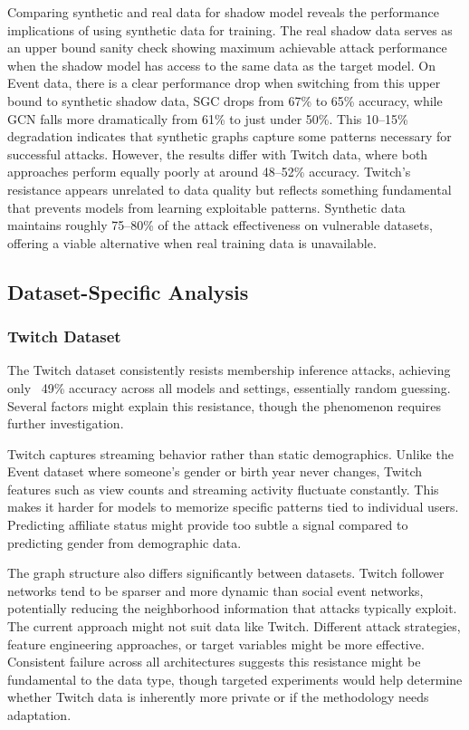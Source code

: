 \documentclass{article}
\begin{document}
Comparing synthetic and real data for shadow model reveals the performance implications of using synthetic data for training. The real shadow data serves as an upper bound sanity check showing maximum achievable attack performance when the shadow model has access to the same data as the target model. On Event data, there is a clear performance drop when switching from this upper bound to synthetic shadow data, SGC drops from 67\% to 65\% accuracy, while GCN falls more dramatically from 61\% to just under 50\%. This 10--15\% degradation indicates that synthetic graphs capture some patterns necessary for successful attacks. However, the results differ with Twitch data, where both approaches perform equally poorly at around 48--52\% accuracy. Twitch's resistance appears unrelated to data quality but reflects something fundamental that prevents models from learning exploitable patterns. Synthetic data maintains roughly 75--80\% of the attack effectiveness on vulnerable datasets, offering a viable alternative when real training data is unavailable.

\subsection{Dataset-Specific Analysis}

\subsubsection{Twitch Dataset}
The Twitch dataset consistently resists membership inference attacks, achieving only ~49\% accuracy across all models and settings, essentially random guessing. Several factors might explain this resistance, though the phenomenon requires further investigation.

Twitch captures streaming behavior rather than static demographics. Unlike the Event dataset where someone's gender or birth year never changes, Twitch features such as view counts and streaming activity fluctuate constantly. This makes it harder for models to memorize specific patterns tied to individual users. Predicting affiliate status might provide too subtle a signal compared to predicting gender from demographic data.

The graph structure also differs significantly between datasets. Twitch follower networks tend to be sparser and more dynamic than social event networks, potentially reducing the neighborhood information that attacks typically exploit. The current approach might not suit data like Twitch. Different attack strategies, feature engineering approaches, or target variables might be more effective. Consistent failure across all architectures suggests this resistance might be fundamental to the data type, though targeted experiments would help determine whether Twitch data is inherently more private or if the methodology needs adaptation.
\end{document}
